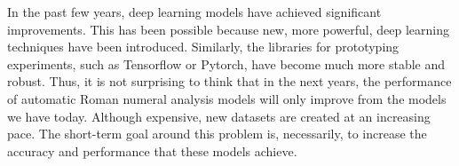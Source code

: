 

In the past few years, deep learning models have achieved
significant improvements. This has been possible because
new, more powerful, deep learning techniques have been
introduced. Similarly, the libraries for prototyping
experiments, such as Tensorflow or Pytorch, have become much
more stable and robust. Thus, it is not surprising to think
that in the next years, the performance of automatic Roman
numeral analysis models will only improve from the models we
have today. Although expensive, new datasets are created at
an increasing pace. The short-term goal around this problem is, necessarily, to increase the accuracy and performance that these models achieve.
